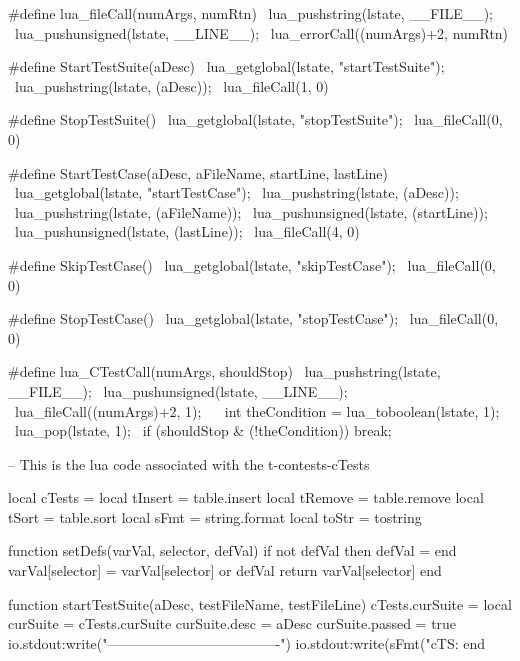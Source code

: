 #define lua_fileCall(numArgs, numRtn)            \
  lua_pushstring(lstate, __FILE__);              \
  lua_pushunsigned(lstate, __LINE__);            \
  lua_errorCall((numArgs)+2, numRtn)

#define StartTestSuite(aDesc)              \
  lua_getglobal(lstate, "startTestSuite"); \
  lua_pushstring(lstate, (aDesc));         \
  lua_fileCall(1, 0)

#define StopTestSuite()                   \
  lua_getglobal(lstate, "stopTestSuite"); \
  lua_fileCall(0, 0)

#define StartTestCase(aDesc, aFileName, startLine, lastLine) \
  lua_getglobal(lstate, "startTestCase");                    \
  lua_pushstring(lstate, (aDesc));                           \
  lua_pushstring(lstate, (aFileName));                       \
  lua_pushunsigned(lstate, (startLine));                     \
  lua_pushunsigned(lstate, (lastLine));                      \
  lua_fileCall(4, 0)

#define SkipTestCase()                   \
  lua_getglobal(lstate, "skipTestCase"); \
  lua_fileCall(0, 0)

#define StopTestCase()                   \
  lua_getglobal(lstate, "stopTestCase"); \
  lua_fileCall(0, 0)

#define lua_CTestCall(numArgs, shouldStop)       \
  lua_pushstring(lstate, __FILE__);              \
  lua_pushunsigned(lstate, __LINE__);            \
  lua_fileCall((numArgs)+2, 1);                  \
  {                                              \
    int theCondition = lua_toboolean(lstate, 1); \
    lua_pop(lstate, 1);                          \
    if (shouldStop & (!theCondition)) break;     \
  }
\stopCHeader

\setLuaCodeStream{cTests}
\startLuaCode
-- This is the lua code associated with the t-contests-cTests

local cTests  = { }
local tInsert = table.insert
local tRemove = table.remove
local tSort   = table.sort
local sFmt    = string.format
local toStr   = tostring

function setDefs(varVal, selector, defVal)
  if not defVal then defVal = { } end
  varVal[selector] = varVal[selector] or defVal
  return varVal[selector]
end

function startTestSuite(aDesc, testFileName, testFileLine)
  cTests.curSuite = { }
  local curSuite  = cTests.curSuite
  curSuite.desc   = aDesc
  curSuite.passed = true
  io.stdout:write("\n-------------------------------------\n")
  io.stdout:write(sFmt("cTS: %
end

